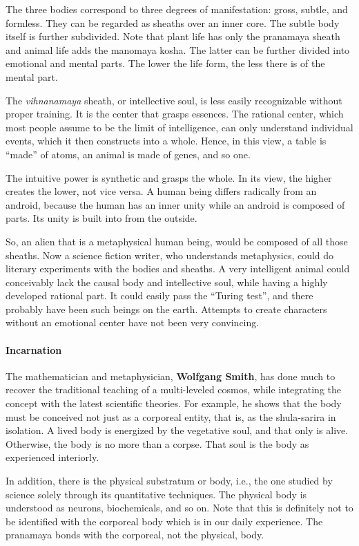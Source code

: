 The three bodies correspond to three degrees of manifestation: gross, subtle, and formless. They can be regarded as sheaths over an inner core. The subtle body itself is further subdivided. Note that plant life has only the pranamaya sheath and animal life adds the manomaya kosha. The latter can be further divided into emotional and mental parts. The lower the life form, the less there is of the mental part.

The \textit{vihnanamaya} sheath, or intellective soul, is less easily recognizable without proper training. It is the center that grasps essences. The rational center, which most people assume to be the limit of intelligence, can only understand individual events, which it then constructs into a whole. Hence, in this view, a table is ``made'' of atoms, an animal is made of genes, and so one.

The intuitive power is synthetic and grasps the whole. In its view, the higher creates the lower, not vice versa. A human being differs radically from an android, because the human has an inner unity while an android is composed of parts. Its unity is built into from the outside.

So, an alien that is a metaphysical human being, would be composed of all those sheaths. Now a science fiction writer, who understands metaphysics, could do literary experiments with the bodies and sheaths. A very intelligent animal could conceivably lack the causal body and intellective soul, while having a highly developed rational part. It could easily pass the ``Turing test'', and there probably have been such beings on the earth. Attempts to create characters without an emotional center have not been very convincing.

\paragraph{Incarnation}


The mathematician and metaphysician, \textbf{Wolfgang Smith}, has done much to recover the traditional teaching of a multi-leveled cosmos, while integrating the concept with the latest scientific theories. For example, he shows that the body must be conceived not just as a corporeal entity, that is, as the shula-sarira in isolation. A lived body is energized by the vegetative soul, and that only is alive. Otherwise, the body is no more than a corpse. That soul is the body as experienced interiorly.

In addition, there is the physical substratum or body, i.e., the one studied by science solely through its quantitative techniques. The physical body is understood as neurons, biochemicals, and so on. Note that this is definitely not to be identified with the corporeal body which is in our daily experience. The pranamaya bonds with the corporeal, not the physical, body.

